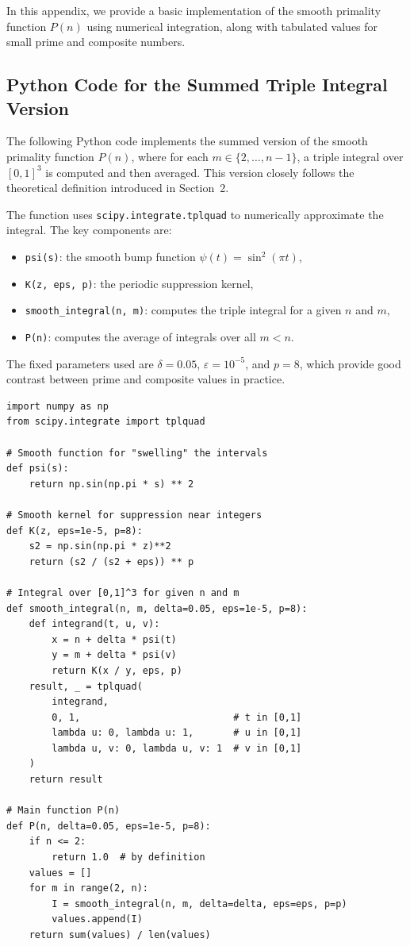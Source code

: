 \documentclass[12pt]{article}
\theoremstyle{definition}
\theoremstyle{plain}
\theoremstyle{remark}
\begin{document}
In this appendix, we provide a basic implementation of the smooth primality function \( P(n) \) using numerical integration, along with tabulated values for small prime and composite numbers.

\subsection{Python Code for the Summed Triple Integral Version}

The following Python code implements the summed version of the smooth primality function \( P(n) \), where for each \( m \in \{2, \dots, n-1\} \), a triple integral over \( [0,1]^3 \) is computed and then averaged. This version closely follows the theoretical definition introduced in Section~2.

The function uses \texttt{scipy.integrate.tplquad} to numerically approximate the integral. The key components are:
\begin{itemize}
  \item \texttt{psi(s)}: the smooth bump function \( \psi(t) = \sin^2(\pi t) \),
  \item \texttt{K(z, eps, p)}: the periodic suppression kernel,
  \item \texttt{smooth\_integral(n, m)}: computes the triple integral for a given \( n \) and \( m \),
  \item \texttt{P(n)}: computes the average of integrals over all \( m < n \).
\end{itemize}

The fixed parameters used are \( \delta = 0.05 \), \( \varepsilon = 10^{-5} \), and \( p = 8 \), which provide good contrast between prime and composite values in practice.

\begin{verbatim}
import numpy as np
from scipy.integrate import tplquad

# Smooth function for "swelling" the intervals
def psi(s):
    return np.sin(np.pi * s) ** 2

# Smooth kernel for suppression near integers
def K(z, eps=1e-5, p=8):
    s2 = np.sin(np.pi * z)**2
    return (s2 / (s2 + eps)) ** p

# Integral over [0,1]^3 for given n and m
def smooth_integral(n, m, delta=0.05, eps=1e-5, p=8):
    def integrand(t, u, v):
        x = n + delta * psi(t)
        y = m + delta * psi(v)
        return K(x / y, eps, p)
    result, _ = tplquad(
        integrand,
        0, 1,                           # t in [0,1]
        lambda u: 0, lambda u: 1,       # u in [0,1]
        lambda u, v: 0, lambda u, v: 1  # v in [0,1]
    )
    return result

# Main function P(n)
def P(n, delta=0.05, eps=1e-5, p=8):
    if n <= 2:
        return 1.0  # by definition
    values = []
    for m in range(2, n):
        I = smooth_integral(n, m, delta=delta, eps=eps, p=p)
        values.append(I)
    return sum(values) / len(values)
\end{verbatim}
\end{document}
